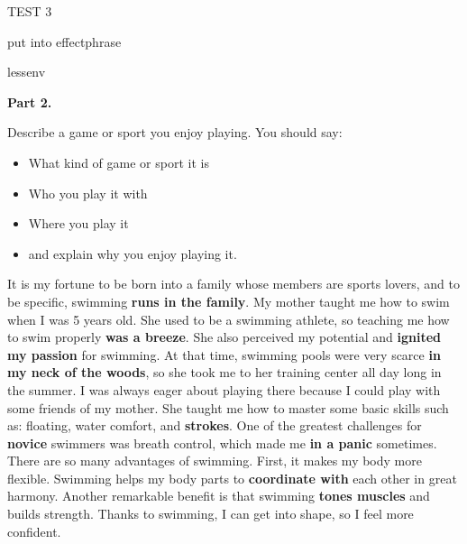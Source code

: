 \begin{glossarymc}[Cambridge 6]
\begin{test}{TEST 3}
\begin{VocabExplain}[Part 1]
            \begin{ExplainCard}{put into effect}{phrase}
            \end{ExplainCard}

            \begin{ExplainCard}{lessen}{v}
            \end{ExplainCard}
        \end{VocabExplain}

    \noindent
    \textbf{Part 2.}
    \begin{qa}{Describe a game or sport you enjoy playing. You should say:}

    \begin{itemize}
    \item What kind of game or sport it is
    \item Who you play it with
    \item Where you play it
    \item and explain why you enjoy playing it.
    \end{itemize}

    It is my fortune to be born into a family whose members are sports lovers, and to be specific, swimming \textbf{runs in the family}. My mother taught me how to swim when I was 5 years old. She used to be a swimming athlete, so teaching me how to swim properly \textbf{was a breeze}. She also perceived my potential and \textbf{ignited my passion} for swimming. At that time, swimming pools were very scarce \textbf{in my neck of the woods}, so she took me to her training center all day long in the summer. I was always eager about playing there because I could play with some friends of my mother. She taught me how to master some basic skills such as: floating, water comfort, and \textbf{strokes}. One of the greatest challenges for \textbf{novice} swimmers was breath control, which made me \textbf{in a panic} sometimes. There are so many advantages of swimming. First, it makes my body more flexible. Swimming helps my body parts to \textbf{coordinate with} each other in great harmony. Another remarkable benefit is that swimming \textbf{tones muscles} and builds strength. Thanks to swimming, I can get into shape, so I feel more confident.
    \end{qa}


\end{test}
\end{glossarymc}
